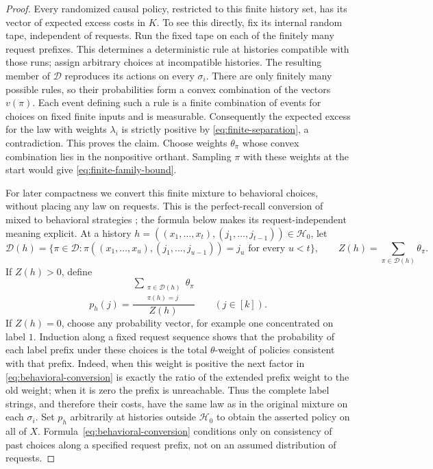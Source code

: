 \begin{proof}
Every randomized causal policy, restricted to this finite history set,
has its vector of expected excess costs in $K$.  To see this directly,
fix its internal random tape, independent of requests.  Run the fixed
tape on each of the finitely many request prefixes.  This determines
a deterministic rule at histories compatible with those runs; assign
arbitrary choices at incompatible histories.  The resulting member of
$\mathcal D$ reproduces its actions on every $\sigma_i$.
There are only finitely many possible rules, so their probabilities
form a convex combination of the vectors $v(\pi)$.  Each event defining
such a rule is a finite combination of events for choices on fixed
finite inputs and is measurable.  Consequently the expected excess
for the law with weights $\lambda_i$ is strictly positive by
\eqref{eq:finite-separation}, a contradiction.  This proves the claim.
Choose weights $\theta_\pi$ whose convex combination lies in the
nonpositive orthant.  Sampling $\pi$ with these weights at the start
would give \eqref{eq:finite-family-bound}.

For later compactness we convert this finite mixture to behavioral
choices, without placing any law on requests. This is the
perfect-recall conversion of mixed to behavioral strategies
\cite{Kuhn53}; the formula below makes its request-independent
meaning explicit.  At a history
$h=((x_1,\ldots,x_t),(j_1,\ldots,j_{t-1}))\in\mathcal H_0$, let
\[
 \mathcal D(h)=\{\pi\in\mathcal D:
   \pi((x_1,\ldots,x_u),(j_1,\ldots,j_{u-1}))=j_u
                    \text{ for every }u<t\},
 \qquad Z(h)=\sum_{\pi\in\mathcal D(h)}\theta_\pi.
\]
If $Z(h)>0$, define
\begin{equation}
 p_h(j)=\frac{\displaystyle
          \sum_{\substack{\pi\in\mathcal D(h)\\\pi(h)=j}}
               \theta_\pi}{Z(h)}\qquad(j\in[k]).
 \label{eq:behavioral-conversion}
\end{equation}
If $Z(h)=0$, choose any probability vector, for example one concentrated
on label $1$.  Induction along a fixed request sequence shows that the
probability of each label prefix under these choices is the total
$\theta$-weight of policies consistent with that prefix.  Indeed, when
this weight is positive the next factor in
\eqref{eq:behavioral-conversion} is exactly the ratio of the extended
prefix weight to the old weight; when it is zero the prefix is
unreachable.  Thus the complete label strings, and therefore their
costs, have the same law as in the original mixture on each $\sigma_i$.
Set $p_h$ arbitrarily at histories outside $\mathcal H_0$ to obtain the
asserted policy on all of $X$.  Formula~\eqref{eq:behavioral-conversion}
conditions only on consistency of past choices along a specified
request prefix, not on an assumed distribution of requests.
\end{proof}

